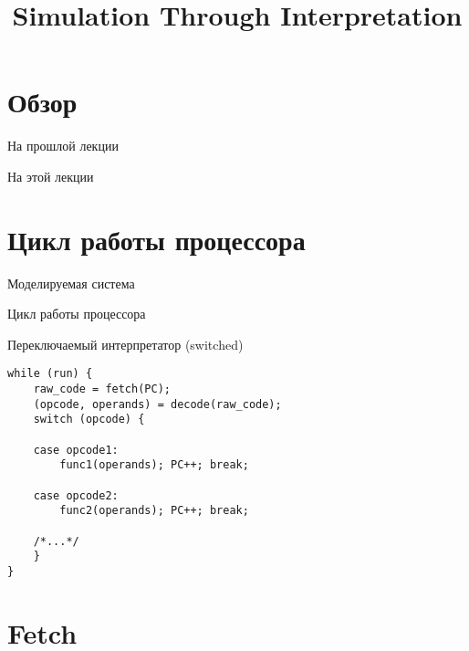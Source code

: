

\title{Simulation Through Interpretation}



\begin{frame}
\titlepage
\end{frame}

\section*{Обзор}

\begin{frame}{На прошлой лекции}
\end{frame}

\begin{frame}{На этой лекции}
\tableofcontents
\end{frame} 


\section{Цикл работы процессора}

\begin{frame}{Моделируемая система}
\centering
\vfill
{}
\vfill
\end{frame}

\begin{frame}{Цикл работы процессора}
\centering
{}
\end{frame}

\begin{frame}[fragile]{Переключаемый интерпретатор (switched)}
\begin{lstlisting}
while (run) {
    raw_code = fetch(PC);
    (opcode, operands) = decode(raw_code);
    switch (opcode) {

    case opcode1:
        func1(operands); PC++; break;

    case opcode2:
        func2(operands); PC++; break;

    /*...*/
    }
}
\end{lstlisting}
\end{frame}

\section{Fetch}

